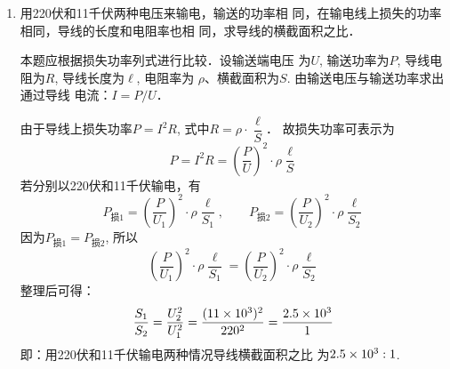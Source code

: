 \begin{enumerate}
\item 用220伏和11千伏两种电压来输电，输送的功率相
同，在输电线上损失的功率相同，导线的长度和电阻率也相
同，求导线的横截面积之比．

\begin{solution}
本题应根据损失功率列式进行比较．设输送端电压
为$U$, 输送功率为$P$, 导线电阻为$R$, 导线长度为$\ell$, 电阻率为
$\rho$、横截面积为$S$. 由输送电压与输送功率求出通过导线
电流：$I=P/U$．

由于导线上损失功率$P=I^2R$, 式中$R=\rho\cdot\dfrac{\ell}{S}$．
故损失功率可表示为
\[P=I^2R=\left(\frac{P}{U}\right)^2\cdot \rho\frac{\ell}{S}\]
若分别以220伏和11千伏输电，有
\[P_{\text{损1}}=\left(\frac{P}{U_1}\right)^2\cdot \rho\frac{\ell}{S_1},\qquad P_{\text{损2}}=\left(\frac{P}{U_2}\right)^2\cdot \rho\frac{\ell}{S_2}\]
因为$P_{\text{损1}}=P_{\text{损2}}$, 所以
\[\left(\frac{P}{U_1}\right)^2\cdot \rho\frac{\ell}{S_1}=\left(\frac{P}{U_2}\right)^2\cdot \rho\frac{\ell}{S_2}\]
整理后可得：
\[\frac{S_1}{S_2}=\frac{U^2_2}{U^2_1}=\frac{(11\times 10^3)^2}{220^2}=\frac{2.5\times 10^3}{1}\]
即：用220伏和11千伏输电两种情况导线横截面积之比
为$2.5\times10^3:1$.
\end{solution}

\end{enumerate}




